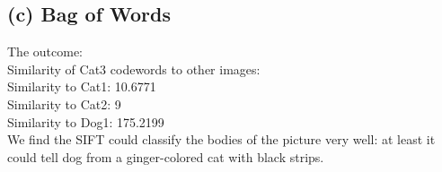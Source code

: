 \documentclass[12pt]{article}
\begin{document}
		\subsection*{(c) Bag of Words}
		The outcome:\\
		Similarity of Cat3 codewords to other images:\\
		Similarity to Cat1: 10.6771\\
		Similarity to Cat2: 9\\
		Similarity to Dog1: 175.2199\\
		We find the SIFT could classify the bodies of the picture very well: at least it could tell dog from a ginger-colored cat with black strips. 
		
\end{document}
